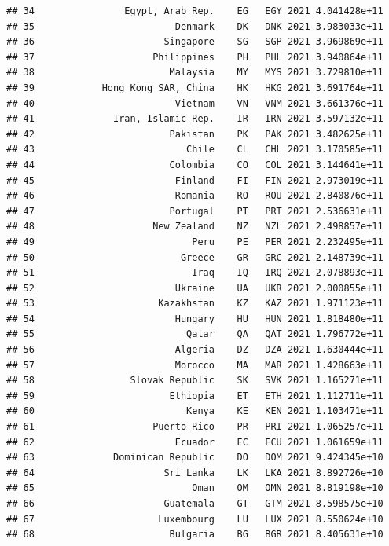 \documentclass[
]{article}
\begin{document}
\begin{verbatim}
## 34                Egypt, Arab Rep.    EG   EGY 2021 4.041428e+11       
## 35                         Denmark    DK   DNK 2021 3.983033e+11       
## 36                       Singapore    SG   SGP 2021 3.969869e+11       
## 37                     Philippines    PH   PHL 2021 3.940864e+11       
## 38                        Malaysia    MY   MYS 2021 3.729810e+11       
## 39            Hong Kong SAR, China    HK   HKG 2021 3.691764e+11       
## 40                         Vietnam    VN   VNM 2021 3.661376e+11       
## 41              Iran, Islamic Rep.    IR   IRN 2021 3.597132e+11       
## 42                        Pakistan    PK   PAK 2021 3.482625e+11       
## 43                           Chile    CL   CHL 2021 3.170585e+11       
## 44                        Colombia    CO   COL 2021 3.144641e+11       
## 45                         Finland    FI   FIN 2021 2.973019e+11       
## 46                         Romania    RO   ROU 2021 2.840876e+11       
## 47                        Portugal    PT   PRT 2021 2.536631e+11       
## 48                     New Zealand    NZ   NZL 2021 2.498857e+11       
## 49                            Peru    PE   PER 2021 2.232495e+11       
## 50                          Greece    GR   GRC 2021 2.148739e+11       
## 51                            Iraq    IQ   IRQ 2021 2.078893e+11       
## 52                         Ukraine    UA   UKR 2021 2.000855e+11       
## 53                      Kazakhstan    KZ   KAZ 2021 1.971123e+11       
## 54                         Hungary    HU   HUN 2021 1.818480e+11       
## 55                           Qatar    QA   QAT 2021 1.796772e+11       
## 56                         Algeria    DZ   DZA 2021 1.630444e+11       
## 57                         Morocco    MA   MAR 2021 1.428663e+11       
## 58                 Slovak Republic    SK   SVK 2021 1.165271e+11       
## 59                        Ethiopia    ET   ETH 2021 1.112711e+11       
## 60                           Kenya    KE   KEN 2021 1.103471e+11       
## 61                     Puerto Rico    PR   PRI 2021 1.065257e+11       
## 62                         Ecuador    EC   ECU 2021 1.061659e+11       
## 63              Dominican Republic    DO   DOM 2021 9.424345e+10       
## 64                       Sri Lanka    LK   LKA 2021 8.892726e+10       
## 65                            Oman    OM   OMN 2021 8.819198e+10       
## 66                       Guatemala    GT   GTM 2021 8.598575e+10       
## 67                      Luxembourg    LU   LUX 2021 8.550624e+10       
## 68                        Bulgaria    BG   BGR 2021 8.405631e+10       

\end{verbatim}
\end{document}
